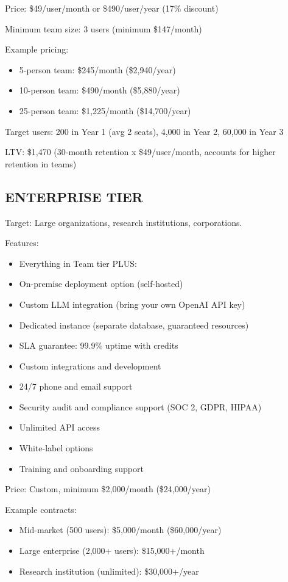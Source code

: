 \documentclass{report}
\begin{document}
Price: \$49/user/month or \$490/user/year (17\% discount)

Minimum team size: 3 users (minimum \$147/month)

Example pricing:
\begin{itemize}
    \item 5-person team: \$245/month (\$2,940/year)
    \item 10-person team: \$490/month (\$5,880/year)
    \item 25-person team: \$1,225/month (\$14,700/year)
\end{itemize}

Target users: 200 in Year 1 (avg 2 seats), 4,000 in Year 2, 60,000 in Year 3

LTV: \$1,470 (30-month retention x \$49/user/month, accounts for higher retention in teams)

\subsection{ENTERPRISE TIER}

Target: Large organizations, research institutions, corporations.

Features:
\begin{itemize}
    \item Everything in Team tier PLUS:
    \item On-premise deployment option (self-hosted)
    \item Custom LLM integration (bring your own OpenAI API key)
    \item Dedicated instance (separate database, guaranteed resources)
    \item SLA guarantee: 99.9\% uptime with credits
    \item Custom integrations and development
    \item 24/7 phone and email support
    \item Security audit and compliance support (SOC 2, GDPR, HIPAA)
    \item Unlimited API access
    \item White-label options
    \item Training and onboarding support
\end{itemize}

Price: Custom, minimum \$2,000/month (\$24,000/year)

Example contracts:
\begin{itemize}
    \item Mid-market (500 users): \$5,000/month (\$60,000/year)
    \item Large enterprise (2,000+ users): \$15,000+/month
    \item Research institution (unlimited): \$30,000+/year
\end{itemize}
\end{document}
